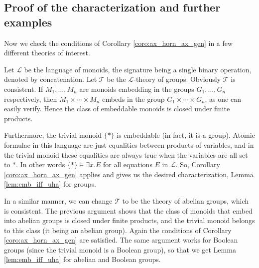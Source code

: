 \subsection{Proof of the characterization and further examples}
Now we check the conditions of Corollary \ref{coro:ax_horn_ax_gen} in a few different theories of interest.
\begin{eg}
	Let $\mathcal{L}$ be the language of monoids, the signature being a single binary operation, denoted by concatenation. Let $\mathcal{T}$ be the $\mathcal{L}$-theory of groups. Obviously $\mathcal{T}$ is consistent. If $M_1,\ldots, M_n$ are monoids embedding in the groups $G_1,\ldots,G_n$ respectively, then $M_1\times\cdots\times M_n$ embeds in the group $G_1\times\cdots \times G_n$, as one can easily verify. Hence the class of embeddable monoids is closed under finite products. 
	
	Furthermore, the trivial monoid $\{\ast\}$ is embeddable (in fact, it is a group). Atomic formulae in this language are just equalities between products of variables, and in the trivial monoid these equalities are always true when the variables are all set to $\ast$. In other words $\{\ast\}\models \exists \bar{x}. E$ for all equations $E$ in $\mathcal{L}$. So, Corollary \ref{coro:ax_horn_ax_gen} applies and gives us the desired characterization, Lemma \ref{lem:emb_iff_uha} for groups.
\end{eg}
\begin{eg}
	In a similar manner, we can change $\mathcal{T}$ to be the theory of abelian groups, which is consistent. The previous argument shows that the class of monoids that embed into abelian groups is closed under finite products, and the trivial monoid belongs to this class (it being an abelian group). Again the conditions of Corollary \ref{coro:ax_horn_ax_gen} are satisfied. The same argument works for Boolean groups (since the trivial monoid is a Boolean group), so that we get Lemma \ref{lem:emb_iff_uha} for abelian and Boolean groups.
\end{eg}
